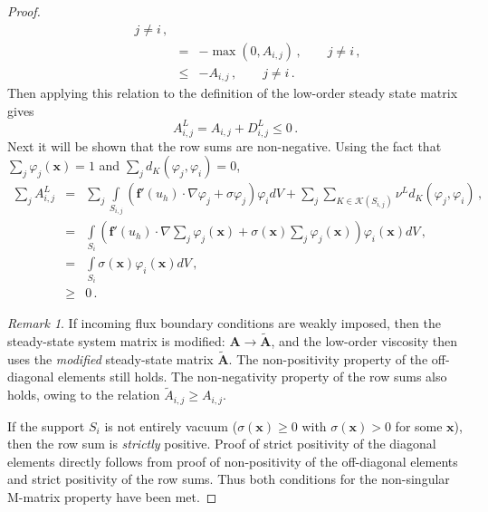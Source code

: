\documentclass[xchauthor,chkrefs,fixeqskip,GCNS,amsmath,amsthm]{yjcphg}
\theoremstyle{remark}
\newtheorem{rmk}{Remark}
\begin{document}
\begin{proof}
\begin{eqnarray*}
\qquad
j\ne i\,,
\\
& = & -\max(0,A_{i,j}) \,,
\qquad
j\ne i\,,
\\
& \le& -A_{i,j}\,,
\qquad
j\ne i\,.
\end{eqnarray*}
%
Then applying this relation to the definition of the low-order steady
state matrix gives
%
\begin{equation*}
A^{L}_{i,j} = A_{i,j} + D_{i,j}^{L} \le0 \,.
\end{equation*}
%
Next it will be shown that the row sums are non-negative. Using the fact
that $\sum\limits_{j}\varphi_{j}(\mathbf{x})=1$ and $\sum\limits_{j}d
_{K}(\varphi_{j},\varphi_{i})=0$,
%
\begin{eqnarray*}
\sum\limits_{j}A^{L}_{i,j}
& = & \sum\limits_{j}\int\limits_{S_{i,j}}
\left( \mathbf{f}'(u_{h})
\cdot\nabla\varphi_{j} +
\sigma\varphi
_{j}\right) \varphi_{i} dV +
\sum\limits_{j}\sum
\limits_{K\in\mathcal{K}(S_{i,j})}\nu^{L}
d_{K}(\varphi_{j},\varphi
_{i})
\,,
\\
& = & \int\limits_{S_{i}}\left(
\mathbf{f}'(u_{h})\cdot\nabla
\sum\limits_{j}\varphi_{j}(\mathbf{x}) +
\sigma(\mathbf{x})\sum
\limits_{j}\varphi_{j}(\mathbf{x})\right)
\varphi_{i}(\mathbf{x}) dV
\,,
\\
\label{eq:rowsum}
& = & \int\limits_{S_{i}}\sigma(\mathbf{x})\varphi_{i}(\mathbf
{x}) dV
\,,
\\
& \ge& 0 \,.
\end{eqnarray*}

\begin{rmk}
If incoming flux boundary conditions are weakly imposed, then the
steady-state system matrix is modified: $\mathbf{A}\rightarrow
\tilde{\mathbf{A}}$, and the low-order viscosity then uses the
\emph{modified} steady-state matrix $\tilde{\mathbf{A}}$. The
non-positivity property of the off-diagonal elements still holds. The
non-negativity property of the row sums also holds, owing to the
relation $\tilde{A}_{i,j} \geq A_{i,j}$.
\end{rmk}

If the support $S_{i}$ is not entirely vacuum ($\sigma(\mathbf{x})
\ge0$ with $\sigma(\mathbf{x}) > 0$ for some $\mathbf{x}$), then the
row sum is \emph{strictly} positive. Proof of strict positivity of the
diagonal elements directly follows from proof of non-positivity of the
off-diagonal elements and strict positivity of the row sums. Thus both
conditions for the non-singular M-matrix property have been met.
\end{proof}
\end{document}
